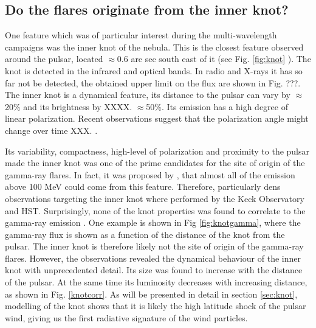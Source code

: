 \subsection{Do the flares originate from the inner knot?}  One feature which was of particular interest during the multi-wavelength campaigns was the inner knot of the nebula. This is the closest feature observed around the pulsar, located $\approx$0.6 arc sec south east of it (see Fig. \ref{fig:knot} ). The knot is detected in the infrared and optical bands. In radio and X-rays it has so far not be detected, the obtained upper limit on the flux are shown in Fig. ???. The inner knot is a dynamical feature, its distance to the pulsar can vary by $\approx$20\%  and its brightness by XXXX. $\approx$50\%.  Its emission has a high degree of linear polarization. Recent observations suggest that the polarization angle might change over time XXX. \citep{moran2015}. 

Its variability, compactness, high-level of polarization and proximity to the pulsar made the inner knot was one of the prime candidates for the site of origin of the gamma-ray flares.  In fact, it was proposed by , that almost all of the emission above 100 MeV could come from this feature. Therefore, particularly dens observations targeting the inner knot where performed by the Keck Observatory and HST. Surprisingly, none of the knot properties was found to correlate to the gamma-ray emission \cite{rudy2015}. One example is shown in Fig \ref{fig:knotgamma},  where the gamma-ray flux is shown as a function of the distance of the knot from the pulsar. The inner knot is therefore likely not the site of origin of the gamma-ray flares. However, the observations revealed the dynamical behaviour of the inner knot with unprecedented detail. Its size was found to increase with the distance of the pulsar. At the same time its luminosity decreases with increasing distance, as shown in Fig. \ref{knotcorr}.  As will be presented in detail in section \ref{sec:knot}, modelling of the knot shows that it is likely the high latitude shock of the pulsar wind, giving us the first radiative signature of the wind particles.